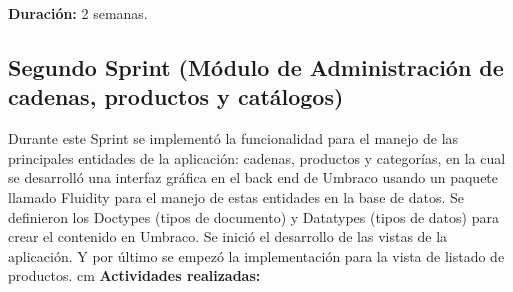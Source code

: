       
\textbf{Duración:} 2 semanas.


\subsection{Segundo Sprint (Módulo de Administración de cadenas, productos y catálogos)}
Durante este Sprint se implementó la funcionalidad para el manejo de las principales entidades de la aplicación: cadenas, productos y categorías, en la cual se desarrolló una interfaz gráfica en el back end de Umbraco usando un paquete llamado Fluidity para el manejo de estas entidades en la base de datos. Se definieron los Doctypes (tipos de documento) y Datatypes (tipos de datos) para crear el contenido en Umbraco. Se inició el desarrollo de las vistas de la aplicación. Y por último se empezó la implementación para la vista de listado de productos.
 cm
\textbf{Actividades realizadas:}

